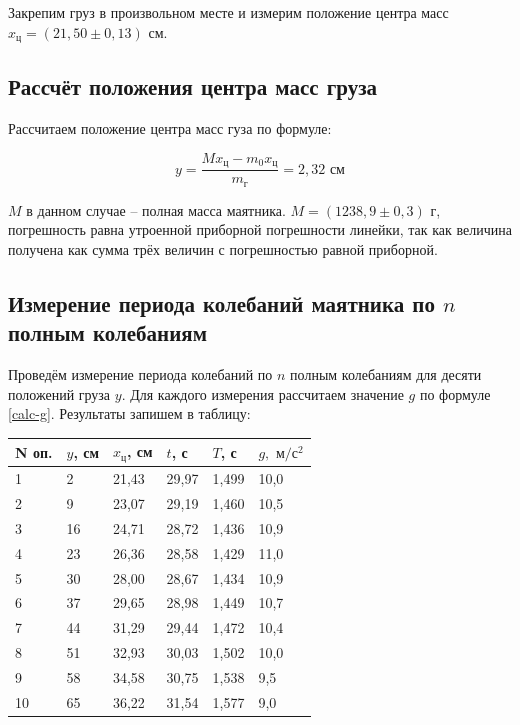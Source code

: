\documentclass[a4paper,12pt]{article}
\begin{document}
Закрепим груз в произвольном месте и измерим положение центра масс $x_\text{ц} = (21,50 \pm 0,13) \text{ см}$.

\subsection{Рассчёт положения центра масс груза}

Рассчитаем положение центра масс гуза по формуле:

\begin{equation}
    y = \frac{M x_\text{ц} - m_0 x_\text{ц}}{m_\text{г}} = 2,32 \text{ см}
\end{equation}

$M$ в данном случае -- полная масса маятника. $M = (1238,9 \pm 0,3) \text{ г}$, погрешность равна утроенной приборной погрешности линейки, так как величина получена как сумма трёх величин с погрешностью равной приборной.

\subsection{Измерение периода колебаний маятника по $n$ полным колебаниям}

Проведём измерение периода колебаний по $n$ полным колебаниям для десяти положений груза $y$. Для каждого измерения рассчитаем значение $g$ по формуле \eqref{calc-g}. Результаты запишем в таблицу:

\begin{table}[!ht]
    \centering
    \begin{tabular}{|l|l|l|l|l|l|}
    \hline
        N оп. & $y$, см & $x_\text{ц}$, см & $t$, с & $T$, с & $g,  \text{ м}/\text{с} ^ 2$ \\ \hline
        1 & 2 & 21,43 & 29,97 & 1,499 & 10,0 \\ \hline
        2 & 9 & 23,07 & 29,19 & 1,460 & 10,5 \\ \hline
        3 & 16 & 24,71 & 28,72 & 1,436 & 10,9 \\ \hline
        4 & 23 & 26,36 & 28,58 & 1,429 & 11,0 \\ \hline
        5 & 30 & 28,00 & 28,67 & 1,434 & 10,9 \\ \hline
        6 & 37 & 29,65 & 28,98 & 1,449 & 10,7 \\ \hline
        7 & 44 & 31,29 & 29,44 & 1,472 & 10,4 \\ \hline
        8 & 51 & 32,93 & 30,03 & 1,502 & 10,0 \\ \hline
        9 & 58 & 34,58 & 30,75 & 1,538 & 9,5 \\ \hline
        10 & 65 & 36,22 & 31,54 & 1,577 & 9,0 \\ \hline
    \end{tabular}
\end{table}
\end{document}
